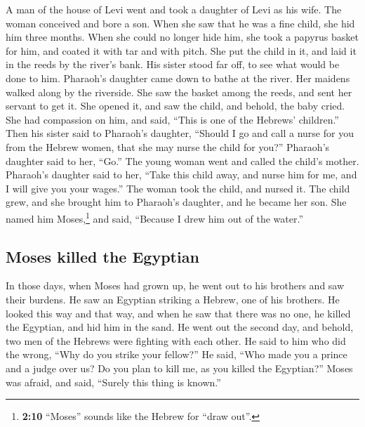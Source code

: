 \begin{paracol}{2}
\begin{otherlanguage}{english}
 A man of the house of Levi went and took a daughter of
Levi as his wife.  The woman conceived and bore a son.
When she saw that he was a fine child, she hid him three months.
 When she could no longer hide him, she took a papyrus
basket for him, and coated it with tar and with pitch. She put the child
in it, and laid it in the reeds by the river's bank.  His
sister stood far off, to see what would be done to him. 
Pharaoh's daughter came down to bathe at the river. Her maidens walked
along by the riverside. She saw the basket among the reeds, and sent her
servant to get it.  She opened it, and saw the child, and
behold, the baby cried. She had compassion on him, and said, ``This is
one of the Hebrews' children.''  Then his sister said to
Pharaoh's daughter, ``Should I go and call a nurse for you from the
Hebrew women, that she may nurse the child for you?'' 
Pharaoh's daughter said to her, ``Go.'' The young woman went and called
the child's mother.  Pharaoh's daughter said to her,
``Take this child away, and nurse him for me, and I will give you your
wages.'' The woman took the child, and nursed it.  The
child grew, and she brought him to Pharaoh's daughter, and he became her
son. She named him Moses,\footnote{\textbf{2:10} ``Moses'' sounds like
  the Hebrew for ``draw out''.} and said, ``Because I drew him out of
the water.''

\hypertarget{moses-killed-the-egyptian}{%
\subsection{Moses killed the Egyptian}\label{moses-killed-the-egyptian}}

 In those days, when Moses had grown up, he went out to
his brothers and saw their burdens. He saw an Egyptian striking a
Hebrew, one of his brothers.  He looked this way and that
way, and when he saw that there was no one, he killed the Egyptian, and
hid him in the sand.  He went out the second day, and
behold, two men of the Hebrews were fighting with each other. He said to
him who did the wrong, ``Why do you strike your fellow?''
 He said, ``Who made you a prince and a judge over us? Do
you plan to kill me, as you killed the Egyptian?'' Moses was afraid, and
said, ``Surely this thing is known.''

\hypertarget{moses-fled-to-midian-and-marries-sephora}{%
}
\end{otherlanguage}
\end{paracol}
